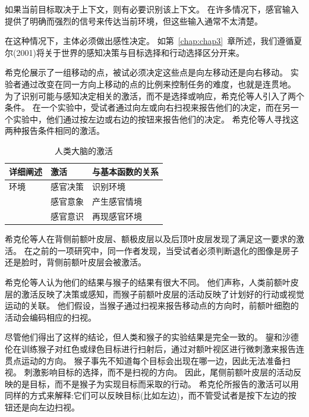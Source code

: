 如果当前目标取决于上下文，则有必要识别该上下文。
在许多情况下，感官输入提供了明确而强烈的信号来传达当前环境，但这些输入通常不太清楚。


在这种情况下，主体必须做出感性决定。
如第~\ref{chap:chap3}~章所述，我们遵循夏尔(2001)将关于世界的感知决策与目标选择和行动选择区分开来。


希克伦\cite{heekeren2006involvement}展示了一组移动的点，被试必须决定这些点是向左移动还是向右移动。
实验者通过改变在同一方向上移动的点的比例来控制任务的难度，也就是连贯地。
为了识别可能与感知决定相关的激活，而不是选择或响应，希克伦等人引入了两个条件。
在一个实验中，受试者通过向左或向右扫视来报告他们的决定，而在另一个实验中，他们通过按左边或右边的按钮来报告他们的决定。
希克伦等人寻找这两种报告条件相同的激活。
\par


\begin{table}[htbp] 
	\newcommand{\tabincell}[2]{\begin{tabular}{@{}#1@{}}#2\end{tabular}} %
	\centering
	\caption{人类大脑的激活\label{tab:9_1}}
	\renewcommand\arraystretch{1.5}	%
	\begin{tabular}{lll}
		\toprule
		详细阐述 & 激活 & 与基本函数的关系\\
		\midrule
		 环境& 感官决策 & 识别环境  \\
		 & 感官意象 & 产生感官情境 \\
		&  感官意识 & 再现感官环境\\
				\bottomrule
	
	\end{tabular}%
\end{table}%


希克伦等人在背侧前额叶皮层、额极皮层以及后顶叶皮层发现了满足这一要求的激活。
在之前的一项研究中\cite{heekeren2004general}，同一作者发现，当受试者必须判断退化的图像是房子还是脸时，背侧前额叶皮层会被激活。
\par


希克伦等人\cite{heekeren2006involvement}认为他们的结果与猴子的结果有很大不同。
他们声称，人类前额叶皮层的激活反映了决策或感知，而猴子前额叶皮层的活动反映了计划好的行动或视觉运动的关联。
他们假设，当猴子通过扫视来报告移动点的方向时，前额叶细胞的活动会编码相应的扫视\cite{kim1999neural}。
\par


尽管他们得出了这样的结论，但人类和猴子的实验结果是完全一致的。
鋆和沙德伦\cite{gold2007neural}在训练猴子对红色或绿色目标进行扫射后，通过对额叶视区进行微刺激来报告连贯点运动的方向。
猴子事先不知道每个目标会出现在哪一边，因此无法准备扫视。
刺激影响目标的选择，而不是扫视的方向。
因此，尾侧前额叶皮层的活动反映的是目标，而不是猴子为实现目标而采取的行动。
希克伦所报告的激活可以用同样的方式来解释:它们可以反映目标(比如左边)，而不管受试者是按下左边的按钮还是向左边扫视。
\par



